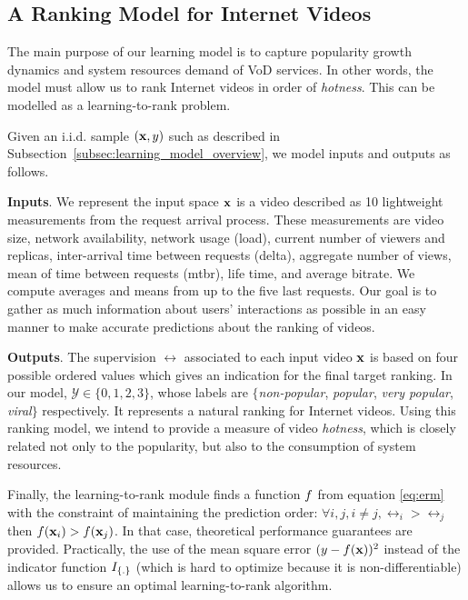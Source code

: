 \subsection{A Ranking Model for Internet Videos}
\label{subsec:learning_model_details}

The main purpose of our learning model is to capture popularity growth dynamics and system resources demand of VoD services. In other words, the model must allow us to rank Internet videos in order of \emph{hotness}. This can be modelled as a learning-to-rank problem. 

Given an i.i.d. sample $({\bf x},y)$ such as described in Subsection~\ref{subsec:learning_model_overview}, we model inputs and outputs as follows. 

\noindent
\textbf{Inputs}. We represent the input space ${\bf x}$ is a video described as 10 lightweight measurements from the request arrival process.  These measurements are video size, network availability, network usage (load), current number of viewers and replicas, inter-arrival time between requests (delta), aggregate number of views, mean of time between requests (mtbr), life time, and average bitrate. We compute averages and means from up to the five last requests. Our goal is to gather as much information about users' interactions as possible in an easy manner to make accurate predictions about the ranking of videos.

\noindent
\textbf{Outputs}. The supervision $\rel$ associated to each input video ${\bf x}$ is based on four possible ordered values which gives an indication for the final target ranking. In our model, $\mathcal{Y} \in \{0,1,2,3\}$, whose labels are $\{$\emph{non-popular}, \emph{popular}, \emph{very popular}, \emph{viral}$\}$ respectively. It represents a natural ranking for Internet videos. Using this ranking model, we intend to provide a measure of video \emph{hotness}, which is closely related not only to the popularity, but also to the consumption of system resources.

Finally, the learning-to-rank module finds a function $f$ from equation \eqref{eq:erm} with the constraint of maintaining the prediction order: $\forall i,j, i \neq j, \rel_i > \rel_j$ then $f({\bf x}_i) > f({\bf x}_j)$. %
In that case, theoretical performance guarantees are provided. Practically, the use of the mean square error $(y - f({\bf x}))^2$ instead of the indicator function  $I_{\left \{ . \right \}}$ (which is hard to optimize because it is non-differentiable) allows us to ensure an optimal learning-to-rank algorithm.

